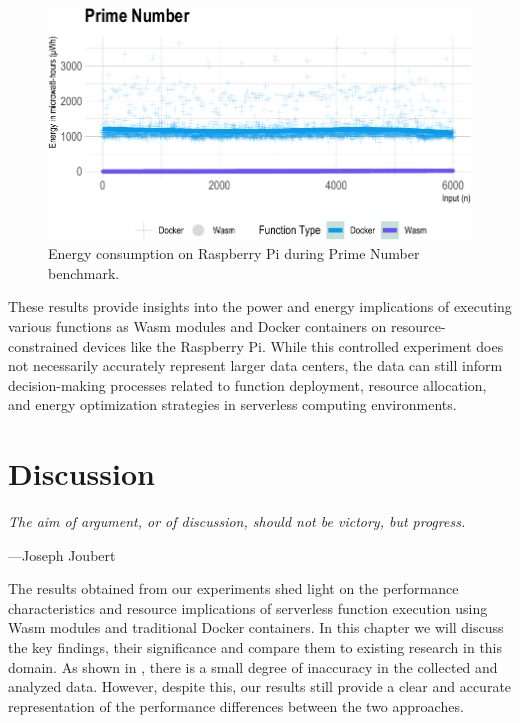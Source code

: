 \documentclass[
  table]{report}
\begin{document}
\begin{figure}[H]

{\centering \includegraphics{thesis_files/figure-latex/prime-energy-1} 

}

\caption{Energy consumption on Raspberry Pi during Prime Number benchmark.}\label{fig:prime-energy}
\end{figure}

These results provide insights into the power and energy implications of
executing various functions as \ac{Wasm} modules and Docker containers
on resource-constrained devices like the Raspberry Pi. While this
controlled experiment does not necessarily accurately represent larger
data centers, the data can still inform decision-making processes
related to function deployment, resource allocation, and energy
optimization strategies in serverless computing environments.

\newpage
\chapter{Discussion}
\label{chap:discussion}

\epigraph{\itshape  
The aim of argument, or of discussion, should not be victory, but progress.
}{---Joseph Joubert}

The results obtained from our experiments shed light on the performance
characteristics and resource implications of serverless function
execution using \ac{Wasm} modules and traditional Docker containers. In
this chapter we will discuss the key findings, their significance and
compare them to existing research in this domain. As shown in
, there is a small degree of inaccuracy in the
collected and analyzed data. However, despite this, our results still
provide a clear and accurate representation of the performance
differences between the two approaches.
\end{document}
